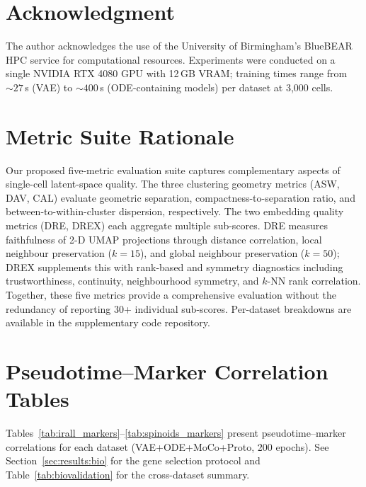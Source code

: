 \documentclass[journal]{IEEEtran}
\begin{document}
\section*{Acknowledgment}
The author acknowledges the use of the University of Birmingham's BlueBEAR HPC service for computational resources. Experiments were conducted on a single NVIDIA RTX 4080 GPU with 12\,GB VRAM; training times range from ${\sim}27$\,s (VAE) to ${\sim}400$\,s (ODE-containing models) per dataset at 3{,}000 cells.


\appendices


\section{Metric Suite Rationale}
\label{sec:supp:subcategory}

Our proposed five-metric evaluation suite captures complementary aspects of single-cell latent-space quality. The three clustering geometry metrics (ASW, DAV, CAL) evaluate geometric separation, compactness-to-separation ratio, and between-to-within-cluster dispersion, respectively. The two embedding quality metrics (DRE, DREX) each aggregate multiple sub-scores. DRE measures faithfulness of 2-D UMAP projections through distance correlation, local neighbour preservation ($k{=}15$), and global neighbour preservation ($k{=}50$); DREX supplements this with rank-based and symmetry diagnostics including trustworthiness, continuity, neighbourhood symmetry, and $k$-NN rank correlation. Together, these five metrics provide a comprehensive evaluation without the redundancy of reporting 30+ individual sub-scores. Per-dataset breakdowns are available in the supplementary code repository.

\clearpage
\section{Pseudotime--Marker Correlation Tables}
\label{sec:supp:markers}

Tables~\ref{tab:irall_markers}--\ref{tab:spinoids_markers} present pseudotime--marker correlations for each dataset (VAE+ODE+MoCo+Proto, 200 epochs). See Section~\ref{sec:results:bio} for the gene selection protocol and Table~\ref{tab:biovalidation} for the cross-dataset summary.
\end{document}
